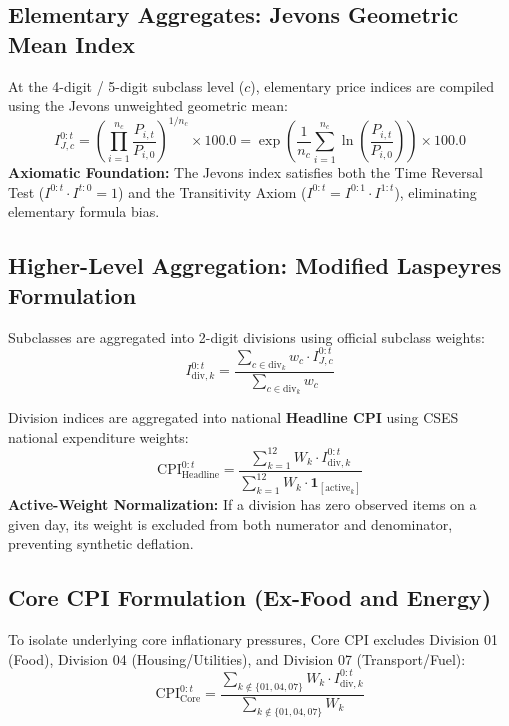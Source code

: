 \documentclass[11pt,a4paper]{article}
\begin{document}
\subsection{Elementary Aggregates: Jevons Geometric Mean Index}
At the 4-digit / 5-digit subclass level ($c$), elementary price indices are compiled using the Jevons unweighted geometric mean:
\begin{equation}
I_{J, c}^{0:t} = \left( \prod_{i=1}^{n_c} \frac{P_{i, t}}{P_{i, 0}} \right)^{1 / n_c} \times 100.0 = \exp \left( \frac{1}{n_c} \sum_{i=1}^{n_c} \ln \left( \frac{P_{i, t}}{P_{i, 0}} \right) \right) \times 100.0
\end{equation}
\textbf{Axiomatic Foundation:} The Jevons index satisfies both the Time Reversal Test ($I^{0:t} \cdot I^{t:0} = 1$) and the Transitivity Axiom ($I^{0:t} = I^{0:1} \cdot I^{1:t}$), eliminating elementary formula bias.

\subsection{Higher-Level Aggregation: Modified Laspeyres Formulation}
Subclasses are aggregated into 2-digit divisions using official subclass weights:
\begin{equation}
I_{\text{div}, k}^{0:t} = \frac{\sum_{c \in \text{div}_k} w_c \cdot I_{J, c}^{0:t}}{\sum_{c \in \text{div}_k} w_c}
\end{equation}

Division indices are aggregated into national \textbf{Headline CPI} using CSES national expenditure weights:
\begin{equation}
\text{CPI}_{\text{Headline}}^{0:t} = \frac{\sum_{k=1}^{12} W_k \cdot I_{\text{div}, k}^{0:t}}{\sum_{k=1}^{12} W_k \cdot \mathbf{1}_{[\text{active}_k]}}
\end{equation}
\textbf{Active-Weight Normalization:} If a division has zero observed items on a given day, its weight is excluded from both numerator and denominator, preventing synthetic deflation.

\subsection{Core CPI Formulation (Ex-Food and Energy)}
To isolate underlying core inflationary pressures, Core CPI excludes Division 01 (Food), Division 04 (Housing/Utilities), and Division 07 (Transport/Fuel):
\begin{equation}
\text{CPI}_{\text{Core}}^{0:t} = \frac{\sum_{k \notin \{01, 04, 07\}} W_k \cdot I_{\text{div}, k}^{0:t}}{\sum_{k \notin \{01, 04, 07\}} W_k}
\end{equation}
\end{document}
